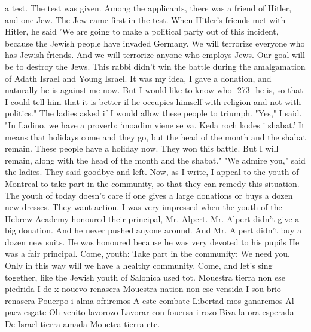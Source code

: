 a test. The test was given. Among the applicants, there was a friend 
of Hitler, and one Jew. The Jew came first in the test. When Hitler's friends met with Hitler, he said 'We are going to make a political party out of this incident, because the Jewish people have 
invaded Germany. We will terrorize everyone who has Jewish friends. 
And we will terrorize anyone who employs Jews. Our goal will be to 
destroy the Jews. 
This rabbi didn't win the battle during the amalgamation of 
Adath Israel and Young Israel. It was my idea, I gave a donation, 
and naturally he is against me now. But I would like to know who 
-273- 
he is, so that I could tell him that it is better if he occupies 
himself with religion and not with politics." 
The ladies asked if I would allow these people to triumph. 
"Yes," I said. "In Ladino, we have a proverb: ‘moadim viene 
se va. Keda roch kodes i shabat.' It means that holidays come 
and they go, but the head of the month and the shabat remain. These 
people have a holiday now. They won this battle. But I will remain, 
along with the head of the month and the shabat." 
"We admire you," said the ladies. They said goodbye and left. 
Now, as I write, I appeal to the youth of Montreal to take 
part in the community, so that they can remedy this situation. The 
youth of today doesn't care if one gives a large donations or buys 
a dozen new dresses. They want action. I was very impressed when 
the youth of the Hebrew Academy honoured their principal, Mr. Alpert. 
Mr. Alpert didn't give a big donation. And he never pushed anyone around. And Mr. Alpert didn't buy a dozen new suits. He was 
honoured because he was very devoted to his pupils He was a fair 
principal. 
Come, youth: Take part in the community: We need you. Only 
in this way will we have a healthy community. Come, and let's 
sing together, like the Jewish youth of Salonica used tot. 
Mouestra tierra non ese piedrida 
I de x nouevo renasera 
Mouestra nation non ese vensida 
I sou brio renasera 
Pouerpo i alma ofriremos 
A este combate 
Libertad mos ganaremos 
Al paez esgate 
Oh venito lavorozo 
Lavorar con fouersa i rozo 
Biva la ora esperada 
De Israel tierra amada 
Mouetra tierra etc. 


